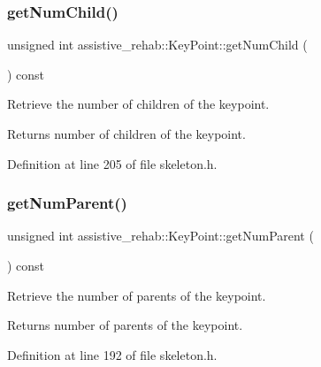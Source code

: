 \subsubsection{\texorpdfstring{getNumChild()}{getNumChild()}}
{\footnotesize\ttfamily unsigned int assistive\+\_\+rehab\+::\+Key\+Point\+::get\+Num\+Child (\begin{DoxyParamCaption}{ }\end{DoxyParamCaption}) const\hspace{0.3cm}{\ttfamily [inline]}}



Retrieve the number of children of the keypoint. 

\begin{DoxyReturn}{Returns}
number of children of the keypoint. 
\end{DoxyReturn}


Definition at line 205 of file skeleton.\+h.


\begin{DoxyCode}{0}

\end{DoxyCode}
\mbox{\label{classassistive__rehab_1_1KeyPoint_acf31a6d7e9ae1be4aa992599435564ad}} 
\subsubsection{\texorpdfstring{getNumParent()}{getNumParent()}}
{\footnotesize\ttfamily unsigned int assistive\+\_\+rehab\+::\+Key\+Point\+::get\+Num\+Parent (\begin{DoxyParamCaption}{ }\end{DoxyParamCaption}) const\hspace{0.3cm}{\ttfamily [inline]}}



Retrieve the number of parents of the keypoint. 

\begin{DoxyReturn}{Returns}
number of parents of the keypoint. 
\end{DoxyReturn}


Definition at line 192 of file skeleton.\+h.


\begin{DoxyCode}{0}

\end{DoxyCode}
\mbox{\label{classassistive__rehab_1_1KeyPoint_a0aa07ed9cc05471af65622fa05329cc3}} 

